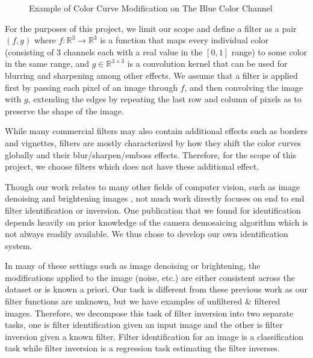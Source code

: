 \documentclass[11pt]{article}
\begin{document}
\begin{figure}[H]
    \centering

    \caption{Example of Color Curve Modification on The Blue Color Channel}
    \label{fig:color_curve}
\end{figure}

For the purposes of this project, we limit our scope and define a filter as a pair $(f, g)$ where $f: \mathbb{R}^3 \rightarrow \mathbb{R}^3$ is a function that maps every individual color (consisting of 3 channels each with a real value in the $[0, 1]$ range) to some color in the same range, and $g \in \mathbb{R}^{3 \times 3}$ is a convolution kernel that can be used for blurring and sharpening among other effects. We assume that a filter is applied first by passing each pixel of an image through $f$, and then convolving the image with $g$, extending the edges by repeating the last row and column of pixels as to preserve the shape of the image.

While many commercial filters may also contain additional effects such as borders and vignettes, filters are mostly characterized by how they shift the color curves globally and their blur/sharpen/emboss effects. Therefore, for the scope of this project, we choose filters which does not have these additional effect.

Though our work relates to many other fields of computer vision, such as image denoising and brightening images \cite{Dark}, not much work directly focuses on end to end filter identification or inversion. One publication that we found \cite{IEEE_Inversion} for identification depends heavily on prior knowledge of the camera demosaicing algorithm which is not always readily available. We thus chose to develop our own identification system.

In many of these settings such as image denoising or brightening, the modifications applied to the image (noise, etc.) are either consistent across the dataset or is known a priori. Our task is different from these previous work as our filter functions are unknown, but we have examples of unfiltered \& filtered images. Therefore, we decompose this task of filter inversion into two separate tasks, one is filter identification given an input image and the other is filter inversion given a known filter. Filter identification for an image is a classification task while filter inversion is a regression task estimating the filter inverses.
\end{document}
